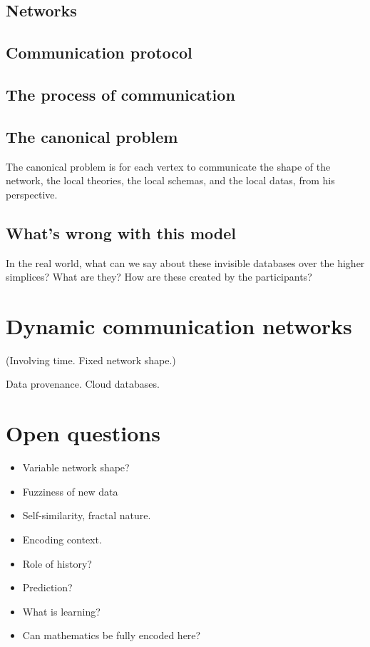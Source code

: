 \documentclass{amsart}
\begin{document}
\subsection{Networks}

\subsection{Communication protocol}

\subsection{The process of communication}

\subsection{The canonical problem}

The canonical problem is for each vertex to communicate the shape of the network, the local theories, the local schemas, and the local datas, from his perspective.  

\subsection{What's wrong with this model}

In the real world, what can we say about these invisible databases over the higher simplices?  What are they?  How are these created by the participants?

\section{Dynamic communication networks}

(Involving time.   Fixed network shape.)

Data provenance.
Cloud databases.

\section{Open questions}

\begin{itemize}

\item Variable network shape?
\item Fuzziness of new data
\item Self-similarity, fractal nature.
\item Encoding context.
\item Role of history?
\item Prediction?
\item What is learning?
\item Can mathematics be fully encoded here?

\end{itemize}
\end{document}
